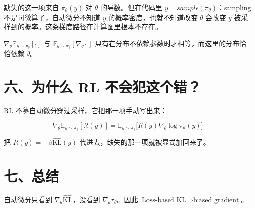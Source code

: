 缺失的这一项来自 \(\pi_\theta(y)\) 对 \(\theta\) 的导数。但在代码里 \(y = sample(\pi_{\theta})\)：sampling 不是可微算子，自动微分不知道 \(y\) 的概率密度，也就不知道改变 \(\theta\) 会改变 \(y\) 被采样到的概率。这条梯度路径在计算图里根本不存在。

\(\nabla_\theta \mathbb{E}_{y\sim\pi_\theta}[\cdot]\) 与 \(\mathbb{E}_{y\sim\pi_\theta}[\nabla_\theta \cdot]\) 只有在分布不依赖参数时才相等，而这里的分布恰恰依赖 \(\theta\)。

\section{六、为什么 RL 不会犯这个错？}

RL 不靠自动微分穿过采样，它把那一项手动写出来：

\[
\nabla_\theta \mathbb{E}_{y\sim\pi_\theta}[R(y)] = \mathbb{E}_{y\sim\pi_\theta} \big[ R(y)\nabla_\theta \log \pi_\theta(y) \big]
\]

把 \(R(y) = -\beta \widehat{\mathrm{KL}}(y)\) 代进去，缺失的那一项就被显式加回来了。

\section{七、总结}

自动微分只看到 \(\nabla_\theta \widehat{\mathrm{KL}}\)，没看到 \(\nabla_\theta \pi_\theta\)。因此 \(\text{Loss-based KL} ⇒ \text{biased gradient}\)。
